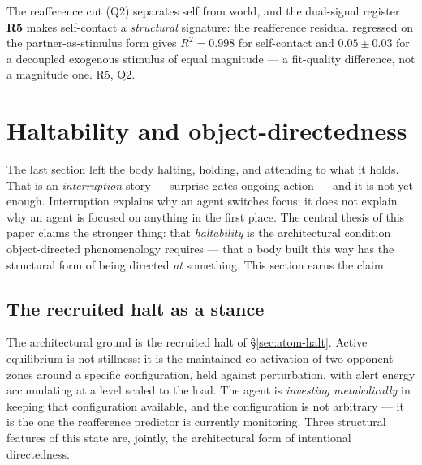 \documentclass{article}
\newcommand{\rtdlink}[2]{\href{https://smn-lab.readthedocs.io/en/latest/#1}{#2}}
\begin{document}
\begin{benchbox}
The reafference cut (Q2) separates self from world, and the dual-signal
register \textbf{R5} makes self-contact a \emph{structural} signature: the
reafference residual regressed on the partner-as-stimulus form gives
$R^2=0.998$ for self-contact and $0.05\pm0.03$ for a decoupled exogenous stimulus
of equal magnitude --- a fit-quality difference, not a magnitude one.
\rtdlink{experiments/sweep_r5_dual_signal/}{R5},
\rtdlink{experiments/q2_reafference/}{Q2}.
\end{benchbox}

\section{Haltability and object-directedness}\label{sec:directedness}

The last section left the body halting, holding, and attending to what
it holds.  That is an \emph{interruption} story --- surprise gates
ongoing action --- and it is not yet enough.  Interruption explains why
an agent switches focus; it does not explain why an agent is focused on
anything in the first place.  The central thesis of this paper claims
the stronger thing: that \emph{haltability} is the architectural
condition object-directed phenomenology requires --- that a body built
this way has the structural form of being directed \emph{at} something.
This section earns the claim.

\subsection{The recruited halt as a stance}\label{sec:direct-stance}

The architectural ground is the recruited halt of \S\ref{sec:atom-halt}.
Active equilibrium is not stillness: it is the maintained co-activation
of two opponent zones around a specific configuration, held against
perturbation, with alert energy accumulating at a level scaled to the
load.  The agent is \emph{investing metabolically} in keeping that
configuration available, and the configuration is not arbitrary --- it is
the one the reafference predictor is currently monitoring.  Three
structural features of this state are, jointly, the architectural form of
intentional directedness.
\end{document}
